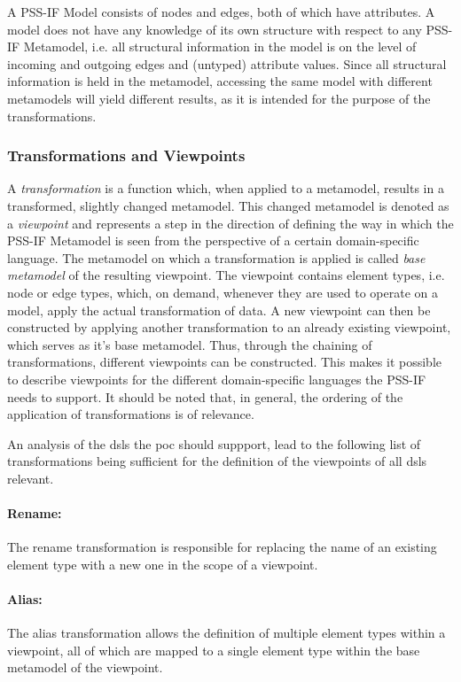 A PSS-IF Model consists of nodes and edges, both of which have attributes. A model does not have any knowledge of its own structure with respect to any PSS-IF Metamodel, i.e. all structural information in the model is on the level of incoming and outgoing edges and (untyped) attribute values. Since all structural information is held in the metamodel, accessing the same model with different metamodels will yield different results, as it is intended for the purpose of the transformations.

\subsubsection{Transformations and Viewpoints}

A \textit{transformation} is a function which, when applied to a metamodel, results in a transformed, slightly changed metamodel. This changed metamodel is denoted as a \textit{viewpoint} and represents a step in the direction of defining the way in which the PSS-IF Metamodel is seen from the perspective of a certain domain-specific language. The metamodel on which a transformation is applied is called \textit{base metamodel} of the resulting viewpoint. The viewpoint contains element types, i.e. node or edge types, which, on demand, whenever they are used to operate on a model, apply the actual transformation of data. A new viewpoint can then be constructed by applying another transformation to an already existing viewpoint, which serves as it's base metamodel. Thus, through the chaining of transformations, different viewpoints can be constructed. This makes it possible to describe viewpoints for the different domain-specific languages the PSS-IF needs to support. It should be noted that, in general, the ordering of the application of transformations is of relevance. 

An analysis of the \glspl{dsl} the \gls{poc} should suppport, lead to the following list of transformations being sufficient for the definition of the viewpoints of all \glspl{dsl} relevant.

\paragraph{Rename:} The rename transformation is responsible for replacing the name of an existing element type with a new one in the scope of a viewpoint.

\paragraph{Alias:} The alias transformation allows the definition of multiple element types within a viewpoint, all of which are mapped to a single element type within the base metamodel of the viewpoint.

